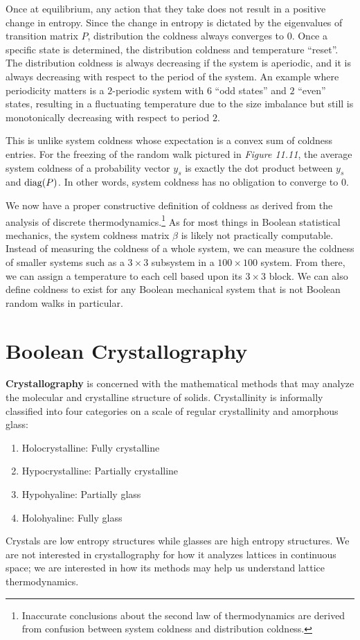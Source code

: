 \documentclass[10pt, a5paper, twoside, openright]{memoir}
\begin{document}
Once at equilibrium, any action that they take does not result in a positive change in entropy. Since the change in entropy is dictated by the eigenvalues of transition matrix $P$, distribution the coldness always converges to $0$. Once a specific state is determined, the distribution coldness and temperature ``reset''. The distribution coldness is always decreasing if the system is aperiodic, and it is always decreasing with respect to the period of the system. An example where periodicity matters is a $2$-periodic system with $6$ ``odd states'' and $2$ ``even'' states, resulting in a fluctuating temperature due to the size imbalance but still is monotonically decreasing with respect to period $2$.

This is unlike system coldness whose expectation is a convex sum of coldness entries. For the freezing of the random walk pictured in \textit{Figure 11.11}, the average system coldness of a probability vector $y_s$ is exactly the dot product between $y_s$ and $\textnormal{diag}(P)$. In other words, system coldness has no obligation to converge to $0$.

We now have a proper constructive definition of coldness as derived from the analysis of discrete thermodynamics.\footnote{Inaccurate conclusions about the second law of thermodynamics are derived from confusion between system coldness and distribution coldness.} As for most things in Boolean statistical mechanics, the system coldness matrix $\beta$ is likely not practically computable. Instead of measuring the coldness of a whole system, we can measure the coldness of smaller systems such as a $3 \times 3$ subsystem in a $100 \times 100$ system. From there, we can assign a temperature to each cell based upon its $3 \times 3$ block. We can also define coldness to exist for any Boolean mechanical system that is not Boolean random walks in particular.

\section{Boolean Crystallography}
\textbf{Crystallography} is concerned with the mathematical methods that may analyze the molecular and crystalline structure of solids. Crystallinity is informally classified into four categories on a scale of regular crystallinity and amorphous glass:
\begin{enumerate}
\item Holocrystalline: Fully crystalline
\item Hypocrystalline: Partially crystalline
\item Hypohyaline: Partially glass
\item Holohyaline: Fully glass
\end{enumerate}
Crystals are low entropy structures while glasses are high entropy structures. We are not interested in crystallography for how it analyzes lattices in continuous space; we are interested in how its methods may help us understand lattice thermodynamics.
\end{document}
